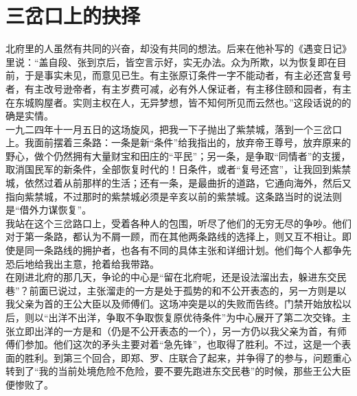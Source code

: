 \fancyhead[RO]{} %
\fancyhead[LE]{} %
\chapter*{三岔口上的抉择}
\thispagestyle{empty}
北府里的人虽然有共同的兴奋，却没有共同的想法。后来在他补写的《遇变日记》里说：“盖自段、张到京后，皆空言示好，实无办法。众为所欺，以为恢复即在目前，于是事实未见，而意见已生。有主张原订条件一字不能动者，有主必还宫复号者，有主改号逊帝者，有主岁费可减，必有外人保证者，有主移住颐和园者，有主在东城购屋者。实则主权在人，无异梦想，皆不知何所见而云然也。”这段话说的的确是实情。\\

一九二四年十一月五日的这场旋风，把我一下子抛出了紫禁城，落到一个三岔口上。我面前摆着三条路：一条是新“条件”给我指出的，放弃帝王尊号，放弃原来的野心，做个仍然拥有大量财宝和田庄的“平民”；另一条，是争取“同情者”的支援，取消国民军的新条件，全部恢复时代的！日条件，或者“复号还宫”，让我回到紫禁城，依然过着从前那样的生活；还有一条，是最曲折的道路，它通向海外，然后又指向紫禁城，不过那时的紫禁城必须是辛亥以前的紫禁城。这条路当时的说法则是“借外力谋恢复”。\\

我站在这个三岔路口上，受着各种人的包围，听尽了他们的无穷无尽的争吵。他们对于第一条路，都认为不屑一顾，而在其他两条路线的选择上，则又互不相让。即使是同一条路线的拥护者，也各有不同的具体主张和详细计划。他们每个人都争先恐后地给我出主意，抢着给我带路。\\

在刚进北府的那几天，争论的中心是“留在北府呢，还是设法溜出去，躲进东交民巷”？前面已说过，主张溜走的一方是处于孤势的和不公开表态的，另一方则是以我父亲为首的王公大臣以及师傅们。这场冲突是以的失败而告终。门禁开始放松以后，则以“出洋不出洋，争取不争取恢复原优待条件”为中心展开了第二次交锋。主张立即出洋的一方是和（仍是不公开表态的一个），另一方仍以我父亲为首，有师傅们参加。他们这次的矛头主要对着“急先锋”，也取得了胜利。不过，这是一个表面的胜利。到第三个回合，即郑、罗、庄联合了起来，并争得了的参与，问题重心转到了“我的当前处境危险不危险，要不要先跑进东交民巷”的时候，那些王公大臣便惨败了。\\


